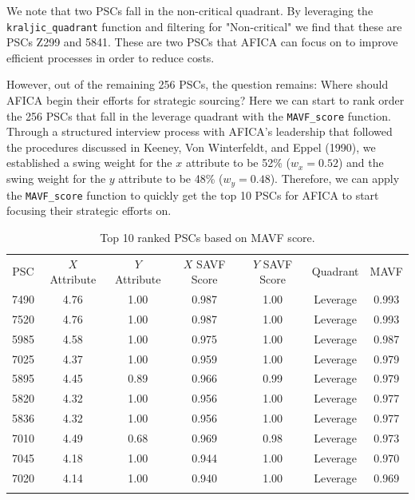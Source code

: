 \documentclass[twocolumn]{svjour3}       %
\begin{document}
We note that two PSCs fall in the non-critical quadrant.  By leveraging the \texttt{kraljic\_quadrant} function and filtering for "Non-critical" we find that these are PSCs Z299 and 5841.  These are two PSCs that AFICA can focus on to improve efficient processes in order to reduce costs.

However, out of the remaining 256 PSCs, the question remains: Where should AFICA begin their efforts for strategic sourcing?  Here we can start to rank order the 256 PSCs that fall in the leverage quadrant with the \texttt{MAVF\_score} function.  Through a structured interview process with AFICA's leadership that followed the procedures discussed in Keeney, Von Winterfeldt, and Eppel (1990), we established a swing weight for the $x$ attribute to be 52\% ($w_x = 0.52$) and the swing weight for the $y$ attribute to be 48\% ($w_y = 0.48$).  Therefore, we can apply the \texttt{MAVF\_score} function to quickly get the top 10 PSCs for AFICA to start focusing their strategic efforts on.  

\begin{table}[!htb]
  \centering
  \caption{Top 10 ranked PSCs based on MAVF score.}
  \label{tab:2}       %
  \begin{tabular}{ccccccc}
    \hline\noalign{\smallskip}
    PSC &	$X$ Attribute	& $Y$ Attribute	& $X$ SAVF Score & $Y$ SAVF Score	& Quadrant &	MAVF \\
    \noalign{\smallskip}\hline\noalign{\smallskip}
    7490 & 4.76 &	1.00 &	0.987 &	1.00 &	Leverage &	0.993 \\
    7520 & 4.76 &	1.00 &	0.987 &	1.00 &	Leverage &	0.993 \\
    5985 & 4.58 &	1.00 &	0.975 &	1.00 &	Leverage &	0.987 \\
    7025 &	4.37 &	1.00 &	0.959 &	1.00 &	Leverage &	0.979 \\
    5895 &	4.45 &	0.89 &	0.966 &	0.99 &	Leverage &	0.979 \\
    5820 &	4.32 &	1.00 &	0.956 &	1.00 &	Leverage &	0.977 \\
    5836 &	4.32 &	1.00 &	0.956 &	1.00 &	Leverage &	0.977 \\
    7010 &	4.49 &	0.68 &	0.969 &	0.98 &	Leverage &	0.973 \\ 
    7045 &	4.18 &	1.00 &	0.944 &	1.00 &	Leverage &	0.970 \\
    7020 &	4.14 &	1.00 &	0.940 &	1.00 &	Leverage &	0.969 \\
    \noalign{\smallskip}\hline
  \end{tabular}
\end{table}
\end{document}
